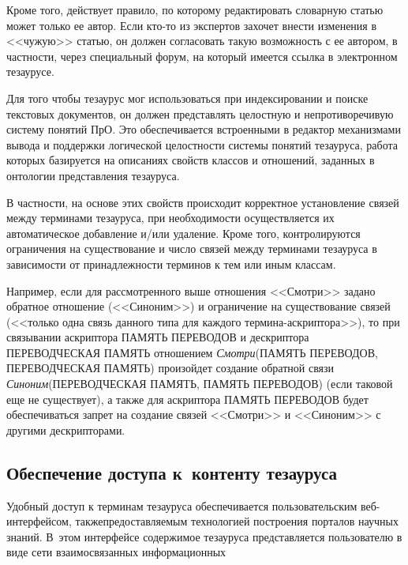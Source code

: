 \begin{multicols}{2}
  Кроме того, действует правило, по которому редактировать словарную статью может 
только ее автор. Если кто-то из экспертов захочет внести изменения в <<чужую>> статью, он 
должен согласовать такую возможность с ее автором, в частности, через специальный 
форум, на который имеется ссылка в электронном тезаурусе. 
  
  Для того чтобы тезаурус мог использоваться при индексировании и поиске текстовых 
документов, он должен представлять целостную и непротиворечивую систему понятий ПрО. 
Это обеспечивается встроенными в редактор механизмами вывода и поддержки логической 
целостности системы понятий тезауруса, работа которых базируется на описаниях свойств 
классов и отношений, заданных в онтологии представления тезауруса.
  
  В частности, на основе этих свойств происходит корректное установление связей между 
терминами тезауруса, при необходимости осуществляется их автоматическое добавление 
и/или удаление. Кроме того, контролируются ограничения на существование и число связей 
между терминами тезауруса в зависимости от принадлежности терминов к тем или иным 
классам.
  
  Например, если для рассмотренного выше отношения <<Смотри>> задано обратное 
отношение (<<Синоним>>) и ограничение на существование связей (<<только одна связь 
данного типа для каж\-до\-го тер\-ми\-на-аскрип\-то\-ра>>), то при связывании аскриптора ПАМЯТЬ 
ПЕРЕВОДОВ и дескриптора ПЕРЕВОДЧЕСКАЯ ПАМЯТЬ отношением 
\textit{Смот\-ри}(ПАМЯТЬ ПЕРЕВОДОВ, ПЕРЕВОДЧЕСКАЯ ПАМЯТЬ) произойдет создание 
обратной связи \textit{Си\-но\-ним}(ПЕРЕВОДЧЕСКАЯ ПАМЯТЬ, ПАМЯТЬ ПЕРЕВОДОВ) 
(если таковой еще не существует), а также для аскриптора ПАМЯТЬ ПЕРЕВОДОВ будет 
обеспечиваться запрет на создание связей <<Смот\-ри>> и <<Синоним>> с другими 
дескрипторами.

\subsection{Обеспечение доступа к~контенту тезауруса}

  Удобный доступ к терминам тезауруса обеспечивается пользовательским 
  веб-интерфейсом, также\linebreak предоставляемым технологией построения порталов научных 
знаний. В~этом интерфейсе содержимое тезауруса представляется пользователю в виде сети 
взаимосвязанных информационных\linebreak\vspace*{-12pt}

\pagebreak

\end{multicols}


